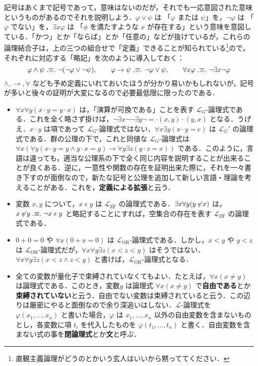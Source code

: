 \documentclass[a4j,xelatex,ja=standard]{ltjsarticle}
\newcommand{\defsym}{\mathrel{.\hspace{-2.5pt}\equiv\hspace{-2.5pt}.}}
\begin{document}
記号はあくまで記号であって，意味はないのだが，それでも一応意図された意味というものがあるのでそれを説明しよう．$\varphi \vee \psi$ は 「$\varphi$ または $\psi$」を，$\neg \varphi$ は 「$\varphi$ でない」を，$\exists x \varphi$ は 「$\phi$ を満たすような $x$ が存在する」という意味を意図している．「かつ」とか「ならば」とか「任意の」などが抜けているが，これらの論理結合子は，上の三つの組合せで「定義」できることが知られている\footnote{直観主義論理がどうのとかいう玄人はいいから黙っててください．}ので，それぞれに対応する「略記」を次のように導入しておく：
\[
 \varphi \wedge \psi \defsym \neg (\neg \varphi \vee \neg \psi), \qquad \varphi \rightarrow \psi \defsym \neg \varphi \vee \psi, \qquad
 \forall x \varphi \defsym \neg \exists x \neg \varphi
\]
$\wedge, \rightarrow, \forall$ なども予め定義にいれておいたほうが分かり易いかもしれないが，記号が多いと後々の証明が大変になるので必要最低限に限ったのである．

\begin{example}
 \begin{itemize}
  \item $\forall x \forall y (x \cdot y = y \cdot x)$ は，「演算が可換である」ことを表す $\mathcal{L}_G$-論理式である．これを全く略さず掛けば，$\neg \exists x \neg \neg \exists y \neg = \cdot(x, y) \cdot(y, x)$ となる．うげえ．$x \cdot y$ は項であって $\mathcal{L}_G$-論理式ではない．$\forall x \exists y (x \cdot y = e)$ は $\mathcal{L}_G'$ の論理式である．群の公理の下で，これと同値な $\mathcal{L}_G$-論理式は $\forall x (\forall y (x \cdot y = y \wedge y \cdot x = y) \rightarrow \forall y \exists z (y \cdot z = x))$ である．このように，言語は違っても，適当な公理系の下で全く同じ内容を説明することが出来ることが良くある．逆に，一意性や関数の存在を証明出来た際に，それを一々書き下すのが面倒なので，新たな記号と公理を追加して新しい言語・理論を考えることがある．これを，{\bfseries 定義による拡張}と云う．
  \item 変数 $x, y$ について，$x \mathrel{\epsilon} y$ は $\mathcal{L}_\mathrm{ZF}$ の論理式である．$\exists x \forall y (y \not\mathrel{\epsilon} x)$ は，$x \not\mathrel{\epsilon} y \defsym \neg x \mathrel{\epsilon} y$ と略記することにすれば，空集合の存在を表す $\mathcal{L}_\mathrm{ZF}$ の論理式である．
  \item $0 + 0 = 0$ や $\forall x (0 + x = 0)$ は $\mathcal{L}_\mathrm{OR}$-論理式である．しかし，$x < y$ や $y < z$ は $\mathcal{L}_\mathrm{OR}$-論理式だが，$\forall x \forall y \exists z (x < z < y)$ はそうではない．$\forall x \forall y \exists z (x < z \wedge z < y)$ と書けば，$\mathcal{L}_\mathrm{OR}$-論理式となる．
  \item 全ての変数が量化子で束縛されていなくてもよい．たとえば，$\forall x (x \neq y)$ は論理式である．このとき，変数$y$ は論理式 $\forall x (x \neq y)$ で{\bfseries 自由である}とか{\bfseries 束縛されていない}と云う．自由でない変数は束縛されていると云う．この辺りは厳密にやると面倒なので余り深追いはしない．$\mathcal{L}$-論理式を $\varphi(x_1, \dots, x_n)$ と書いた場合，$\varphi$ は $x_1, \dots, x_n$ 以外の自由変数を含まないものとし，各変数に項 $t_i$ を代入したものを $\varphi(t_1, \dots, t_n)$ と書く．自由変数を含まない式の事を{\bfseries 閉論理式}とか{\bfseries 文}と呼ぶ．
 \end{itemize}
\end{example}
\end{document}
